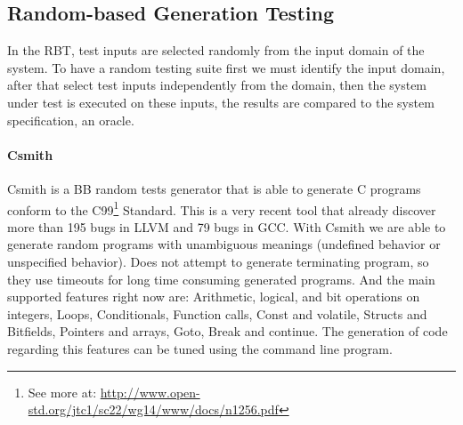 \subsection{Random-based Generation Testing}
In the \ac{RBT}, test inputs are selected randomly from the input domain of the system.
To have a random testing suite first we must identify the input domain, after that select test inputs independently from the domain,
then the system under test is executed on these inputs, the results are compared to the system specification, an oracle.
\paragraph{Csmith}
Csmith\cite{Yang:2011:FUB:1993316.1993532} is a \ac{BB} random tests generator that is able to generate C programs
conform to the C99\footnote{See more at: \url{http://www.open-std.org/jtc1/sc22/wg14/www/docs/n1256.pdf}} Standard. This is a very recent tool that already discover
more than 195 bugs in \ac{LLVM} and 79 bugs in \ac{GCC}. With Csmith we are able to generate random programs with unambiguous meanings (undefined behavior or 
unspecified behavior). Does not attempt to generate terminating program, so they use timeouts for long time consuming generated programs.
And the main supported features right now are: Arithmetic, logical, and bit operations on integers, Loops, Conditionals, Function calls, Const and volatile,
Structs and Bitfields, Pointers and arrays, Goto, Break and continue. The generation of code regarding this features can be tuned using the command line program.

